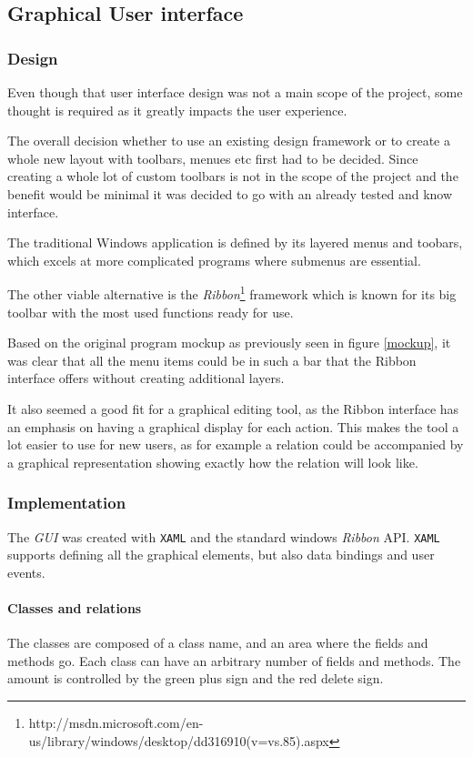 \subsection{Graphical User interface}

\subsubsection{Design}

Even though that
user interface design was not a main scope of the project, some thought is
required as it greatly impacts the user experience. 

The overall decision whether to use an existing design
framework or to create a whole new layout with toolbars, menues etc first had to
be decided. Since creating a whole lot of custom toolbars
is not in the scope of the project and the benefit would be minimal it was
decided to go with an already tested and know interface. 

The traditional Windows application is defined by its layered menus and toobars,
which excels at more complicated programs where submenus are essential.

The other viable alternative is the
\textit{Ribbon}\footnote{http://msdn.microsoft.com/en-us/library/windows/desktop/dd316910(v=vs.85).aspx}
framework which is known for its big toolbar with the most used functions ready
for use.

Based on the original program mockup as previously seen in figure \ref{mockup},
it was clear that all the menu items could be in such a bar that the Ribbon
interface offers without creating additional layers.

It also seemed a good fit for a graphical editing tool, as the Ribbon interface
has an emphasis on having a graphical display for each action. This makes the
tool a lot easier to use for new users, as for example a relation could be
accompanied by a graphical representation showing exactly how the relation will
look like.

\subsubsection{Implementation} 
The \textit{GUI} was created with \texttt{XAML} and the standard windows
\textit{Ribbon} API. \texttt{XAML} supports defining all the graphical elements,
but also data bindings and user events.

\paragraph{Classes and relations}
The classes are composed of a class name, and an area where the
fields and methods go. Each class can have an arbitrary number of fields and
methods. The
amount is controlled by the green plus sign and the red delete sign.

